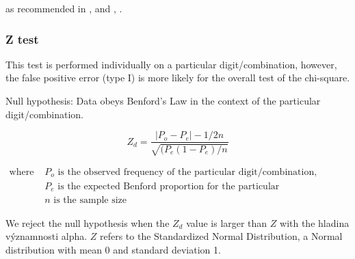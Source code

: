 as recommended in \citeauthor{Hronova2023}, \citeyear{Hronova2023} and  \citeauthor{kossovsky2014benford}, \citeyear{kossovsky2014benford}. %




\subsubsection*{Z test}

This test is performed individually on a particular digit/combination, however, the false positive error (type I) is more likely for the overall test of the chi-square.

Null hypothesis: Data obeys Benford's Law in the context of the particular digit/combination. %

\begin{equation}
    \label{z_test}
    Z_d = \frac{|P_o - P_e| - 1/2n}{\sqrt{(P_e(1-P_e)/n}}
\end{equation}

\begin{align*}
    \text{where } &P_o \text{ is the observed frequency of the particular digit/combination}, \\
    &P_e \text{ is the expected Benford proportion for the particular digit/combination, and} \\ 
    &n \text{ is the sample size}
\end{align*} 

We reject the null hypothesis when the $Z_d$ value is larger than $Z$ with the hladina významnosti alpha. $Z$ refers to the Standardized Normal Distribution, a Normal distribution with mean 0 and standard deviation 1. 

